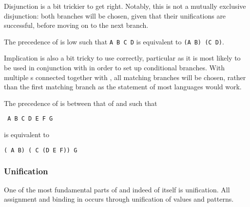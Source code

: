 Disjunction is a bit trickier to get right. Notably, this is not a mutually
exclusive disjunction: both branches will be chosen, given that their unifications
are successful, before moving on to the next branch.

The precedence of  is low such that \texttt{A  B  C  D}
is equivalent to \texttt{(A  B)  (C  D)}.

\begin{prooftree}
\end{prooftree}

\begin{prooftree}
\end{prooftree}

Implication is also a bit tricky to use correctly, particular as it is most likely
to be used in conjunction with  in order to set up conditional branches.
With multiple s connected together with , all matching branches
will be chosen, rather than the first matching branch as the  statement
of most languages would work.

The precedence of  is between that of  and  such that

\begin{center}
\texttt{ A  B   C  D   E  F  G}
\end{center}

is equivalent to

\begin{center}
\texttt{( A  B)  ( C  (D   E  F))  G}
\end{center}

\subsubsection{Unification}

One of the most fundamental parts of \Law{} and indeed of \Trilogy{} itself
is unification. All assignment and binding in \Trilogy{} occurs through
unification of values and patterns.

